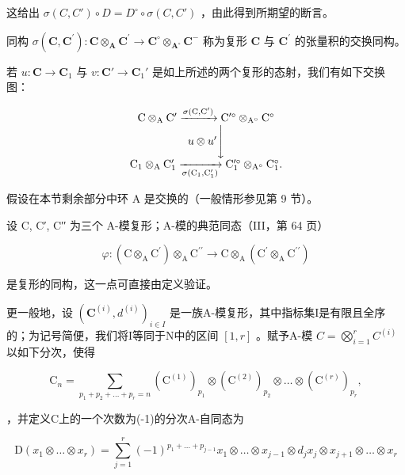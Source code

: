 这给出 \(\sigma(C, C') \circ D = D^{\circ} \circ \sigma(C, C')\) ，由此得到所期望的断言。

同构 \(\sigma(\mathbf{C},\mathbf{C}^{\prime}):\mathbf{C}\otimes_{\mathbf{A}}\mathbf{C}^{\prime}\to\mathbf{C}^{\circ}\otimes_{\mathbf{A}^{\circ}}\mathbf{C}^{-}\) 称为复形 \(\mathbf{C}\) 与 \(\mathbf{C}^{\prime}\) 的张量积的交换同构。

若 \(u: \mathbf{C} \to \mathbf{C}_{1}\) 与 \(v: \mathbf{C}' \to \mathbf{C}_{1}'\) 是如上所述的两个复形的态射，我们有如下交换图：

\[
\begin{array}{c} \mathrm{C} \otimes_ {\mathrm{A}} \mathrm{C} ^ {\prime} \xrightarrow {\sigma (\mathrm{C} , \mathrm{C} ^ {\prime})} \mathrm{C} ^ {\prime \circ} \otimes_ {\mathrm{A} ^ {\circ}} \mathrm{C} ^ {\circ} \\ u \otimes u ^ {\prime} \Bigg \downarrow \\ \mathrm{C} _ {1} \otimes_ {\mathrm{A}} \mathrm{C} _ {1} ^ {\prime} \xrightarrow [ \sigma (\mathrm{C} _ {1} , \mathrm{C} _ {1} ^ {\prime}) ]{} \mathrm{C} _ {1} ^ {\prime \circ} \otimes_ {\mathrm{A} ^ {\circ}} \mathrm{C} _ {1} ^ {\circ}. \end{array}
\]

假设在本节剩余部分中环 A 是交换的（一般情形参见第 9 节）。

设 C, C′, C′′ 为三个 A-模复形；A-模的典范同态（III，第 64 页）

\[
\varphi : \left(\mathrm{C} \otimes_ {\mathrm{A}} \mathrm{C} ^ {\prime}\right) \otimes_ {\mathrm{A}} \mathrm{C} ^ {\prime \prime} \rightarrow \mathrm{C} \otimes_ {\mathrm{A}} \left(\mathrm{C} ^ {\prime} \otimes_ {\mathrm{A}} \mathrm{C} ^ {\prime \prime}\right)
\]

是复形的同构，这一点可直接由定义验证。

更一般地，设 \((\mathbf{C}^{(i)}, d^{(i)})_{i \in I}\) 是一族A-模复形，其中指标集I是有限且全序的；为记号简便，我们将I等同于N中的区间 \([1, r]\) 。赋予A-模 \(C = \bigotimes_{i=1}^{r} C^{(i)}\) 以如下分次，使得

\[
\mathrm{C} _ {n} = \sum_ {p _ {1} + p _ {2} + \dots + p _ {r} = n} (\mathrm{C} ^ {(1)}) _ {p _ {1}} \otimes (\mathrm{C} ^ {(2)}) _ {p _ {2}} \otimes \dots \otimes (\mathrm{C} ^ {(r)}) _ {p _ {r}},
\]

，并定义C上的一个次数为(-1)的分次A-自同态为

\[
\mathrm{D} \left(x _ {1} \otimes \dots \otimes x _ {r}\right) = \sum_ {j = 1} ^ {r} (- 1) ^ {p _ {1} + \dots + p _ {j - 1}} x _ {1} \otimes \dots \otimes x _ {j - 1} \otimes d _ {j} x _ {j} \otimes x _ {j + 1} \otimes \dots \otimes x _ {r}
\]

